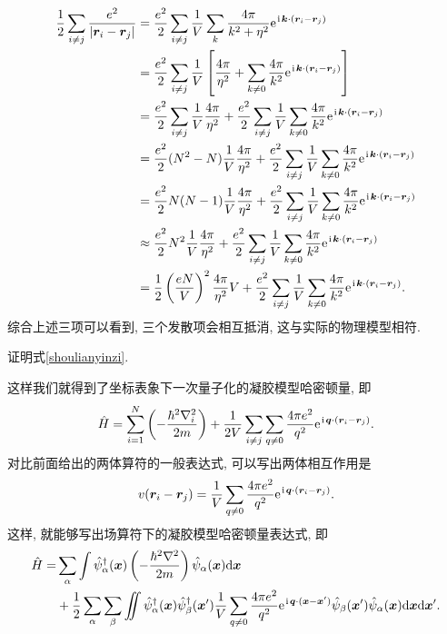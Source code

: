 \begin{align}
      \frac{1}{2}\sum_{i\ne j}\frac{e^2}{|\boldsymbol{r}_i-\boldsymbol{r}_j|}&=\frac{e^2}{2}\sum_{i\ne j}\frac{1}{V}\sum_{ k}\frac{4\pi}{k^2+\eta^2}\mathrm{e}^{\hspace{0.1em}\mathrm{i}\hspace{0.1em}\boldsymbol{k}\cdot(\boldsymbol{r}_i-\boldsymbol{r}_j)}\nonumber\\
      &=\frac{e^2}{2}\sum_{i\ne j}\frac{1}{V}\left[ \frac{4\pi}{\eta^2}+\sum_{{k}\ne 0}\frac{4\pi}{k^2}\mathrm{e}^{\hspace{0.1em}\mathrm{i}\hspace{0.1em}\boldsymbol{k}\cdot (\boldsymbol{r}_i-\boldsymbol{r}_j)} \right]\nonumber\\
      &=\frac{e^2}{2}\sum_{i\ne j}\frac{1}{V}\frac{4\pi}{\eta^2}+\frac{e^2}{2}\sum_{i\ne j}\frac{1}{V}\sum_{k\ne 0}\frac{4\pi}{k^2}\mathrm{e}^{\hspace{0.1em}\mathrm{i}\hspace{0.1em}\boldsymbol{k}\cdot(\boldsymbol{r}_i-\boldsymbol{r}_j)}\nonumber\\
      &=\frac{e^2}{2}(N^2-N)\frac{1}{V}\frac{4\pi}{\eta^2}+\frac{e^2}{2}\sum_{i\ne j}\frac{1}{V}\sum_{ k\ne 0}\frac{4\pi}{k^2}\mathrm{e}^{\hspace{0.1em}\mathrm{i}\hspace{0.1em}\boldsymbol{k}\cdot(\boldsymbol{r}_i-\boldsymbol{r}_j)}\nonumber\\
      &=\frac{e^2}{2}N(N-1)\frac{1}{V}\frac{4\pi}{\eta^2}+\frac{e^2}{2}\sum_{i\ne j}\frac{1}{V}\sum_{ k\ne 0}\frac{4\pi}{k^2}\mathrm{e}^{\hspace{0.1em}\mathrm{i}\hspace{0.1em}\boldsymbol{k}\cdot(\boldsymbol{r}_i-\boldsymbol{r}_j)}\nonumber\\
      &\approx \frac{e^2}{2}N^2\frac{1}{V}\frac{4\pi}{\eta^2}+\frac{e^2}{2}\sum_{i\ne j}\frac{1}{V}\sum_{k\ne 0}\frac{4\pi}{k^2}\mathrm{e}^{\hspace{0.1em}\mathrm{i}\hspace{0.1em}\boldsymbol{k}\cdot(\boldsymbol{r}_i-\boldsymbol{r}_j)}\nonumber\\
      &= \frac{1}{2}\left( \frac{eN}{V} \right)^2 \frac{4\pi}{\eta^2}V+\frac{e^2}{2}\sum_{i\ne j}\frac{1}{V}\sum_{ k\ne 0}\frac{4\pi}{k^2}\mathrm{e}^{\hspace{0.1em}\mathrm{i}\hspace{0.1em}\boldsymbol{k}\cdot(\boldsymbol{r}_i-\boldsymbol{r}_j)}. 
   \end{align}
综合上述三项可以看到, 三个发散项会相互抵消, 这与实际的物理模型相符. 

\begin{question}{}{}
证明式\eqref{shoulianyinzi}.
\end{question}

这样我们就得到了坐标表象下一次量子化的凝胶模型哈密顿量, 即
\begin{equation}
   \hat H=\sum_{i=1}^N\left( -\frac{\hbar^2\nabla_i^2}{2m} \right)+\frac{1}{2V}\sum_{i\ne j}\sum_{q\ne 0}\frac{4\pi e^2}{q^2}\mathrm{e}^{\hspace{0.1em}\mathrm{i}\hspace{0.1em} \boldsymbol{q}\cdot(\boldsymbol{r}_i-\boldsymbol{r}_j)}. 
   \label{1qtH_jellium}
\end{equation}
对比前面给出的两体算符的一般表达式, 可以写出两体相互作用是
\begin{equation}
   v(\boldsymbol{r}_i-\boldsymbol{r}_j)=\frac{1}{V}\sum_{q\ne 0}\frac{4\pi e^2}{q^2}\mathrm{e}^{\hspace{0.1em}\mathrm{i}\hspace{0.1em}\boldsymbol{q}\cdot (\boldsymbol{r}_i-\boldsymbol{r}_j)}. 
\end{equation}
这样, 就能够写出场算符下的凝胶模型哈密顿量表达式, 即
 \begin{align}
      \hat H=&\sum_{\alpha}\int\hat\psi_\alpha^\dagger(\boldsymbol{x})\left( -\frac{\hbar^2\nabla^2}{2m} \right)\hat \psi_\alpha(\boldsymbol{x})\mathrm{d}\boldsymbol{x}\nonumber\\
      &+\frac{1}{2}\sum_\alpha\sum_\beta\iint\hat\psi_\alpha^\dagger(\boldsymbol{x})\hat\psi_\beta^\dagger(\boldsymbol{x}')\frac{1}{V}\sum_{ q\ne 0}\frac{4\pi e^2}{q^2}\mathrm{e}^{\hspace{0.1em}\mathrm{i}\hspace{0.1em}\boldsymbol{q}\cdot(\boldsymbol{x}-\boldsymbol{x}')}\hat\psi_\beta(\boldsymbol{x}')\hat\psi_\alpha(\boldsymbol{x})\mathrm{d}\boldsymbol{x}\mathrm{d}\boldsymbol{x}'. 
   \end{align}

